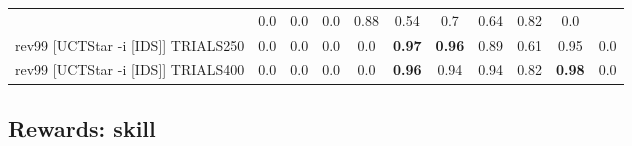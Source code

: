 \documentclass{article}
\begin{document}
\begin{tabular}{|l|r@{$\pm$}rr@{$\pm$}rr@{$\pm$}rr@{$\pm$}rr@{$\pm$}rr@{$\pm$}rr@{$\pm$}rr@{$\pm$}rr@{$\pm$}rr@{$\pm$}r|}
& \multicolumn{2}{c}{0.0}
& \multicolumn{2}{c}{0.0}
& \multicolumn{2}{c}{0.0}
& \multicolumn{2}{c}{0.88}
& \multicolumn{2}{c}{0.54}
& \multicolumn{2}{c}{0.7}
& \multicolumn{2}{c}{0.64}
& \multicolumn{2}{c}{0.82}
& \multicolumn{2}{c|}{0.0}
\\
rev99 [UCTStar -i [IDS]] TRIALS250
& \multicolumn{2}{c}{0.0}
& \multicolumn{2}{c}{0.0}
& \multicolumn{2}{c}{0.0}
& \multicolumn{2}{c}{0.0}
& \multicolumn{2}{c}{\textbf{0.97}}
& \multicolumn{2}{c}{\textbf{0.96}}
& \multicolumn{2}{c}{0.89}
& \multicolumn{2}{c}{0.61}
& \multicolumn{2}{c}{0.95}
& \multicolumn{2}{c|}{0.0}
\\
rev99 [UCTStar -i [IDS]] TRIALS400
& \multicolumn{2}{c}{0.0}
& \multicolumn{2}{c}{0.0}
& \multicolumn{2}{c}{0.0}
& \multicolumn{2}{c}{0.0}
& \multicolumn{2}{c}{\textbf{0.96}}
& \multicolumn{2}{c}{0.94}
& \multicolumn{2}{c}{0.94}
& \multicolumn{2}{c}{0.82}
& \multicolumn{2}{c}{\textbf{0.98}}
& \multicolumn{2}{c|}{0.0}
\\
\hline
\end{tabular}%

\bigskip

\subsection*{Rewards: skill}
\end{document}
